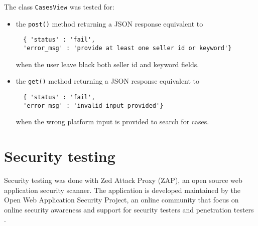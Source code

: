 The class \texttt{CasesView} was tested for:
\begin{itemize}
  \item the \texttt{post()} method returning a JSON response equivalent to
  \begin{verbatim}
  { 'status' : 'fail',
  'error_msg' : 'provide at least one seller id or keyword'} \end{verbatim} when
  the user leave black both seller id and keyword fields.
  \item the \texttt{get()} method returning a JSON response equivalent to
  \begin{verbatim}
  { 'status' : 'fail',
  'error_msg' : 'invalid input provided'} \end{verbatim} when the wrong platform
  input is provided to search for cases.
\end{itemize}


\section{Security testing}
Security testing was done with Zed Attack Proxy (ZAP), an open source web
application security scanner. The application is developed maintained by the
Open Web Application Security Project, an online community that focus on online
security awareness and support for security testers and penetration testers
\cite{zap}.

